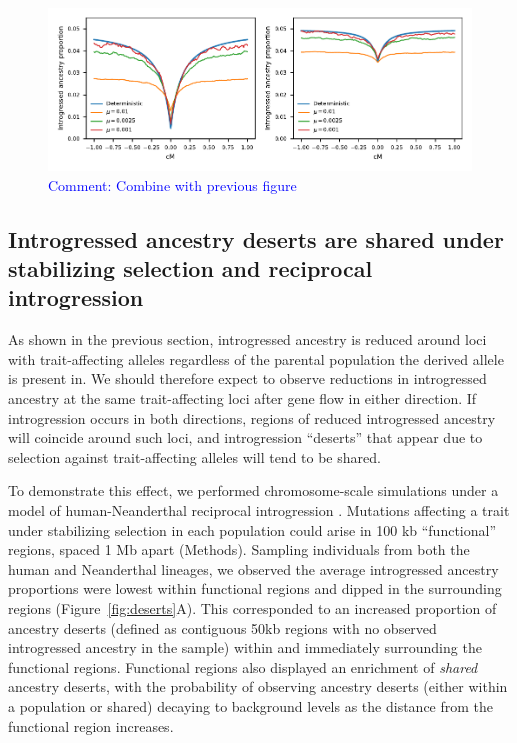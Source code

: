 \documentclass{article}
\newcommand{\aprcomment}[1]{{\textcolor{blue}{Comment: #1}}}
\begin{document}
\begin{figure}[t!]
    \centering
    \includegraphics{../figures/linkage_simulation.pdf}
    \caption{
        \textbf{}
        \aprcomment{Combine with previous figure}
    }
    \label{fig:linkage-sim}
\end{figure}

\subsection*{Introgressed ancestry deserts are shared under stabilizing
selection and reciprocal introgression}

As shown in the previous section, introgressed ancestry is reduced around loci
with trait-affecting alleles regardless of the parental population the derived
allele is present in. We should therefore expect to observe reductions in
introgressed ancestry at the same trait-affecting loci after gene flow in
either direction. If introgression occurs in both directions, regions of
reduced introgressed ancestry will coincide around such loci, and introgression
``deserts'' that appear due to selection against trait-affecting alleles will
tend to be shared.

To demonstrate this effect, we performed chromosome-scale simulations under a
model of human-Neanderthal reciprocal introgression
\citep[Figure~\ref{fig:neand-to-human}A,][]{harris2023diverse}. Mutations
affecting a trait under stabilizing selection in each population could arise in
100 kb ``functional'' regions, spaced 1 Mb apart (Methods). Sampling
individuals from both the human and Neanderthal lineages, we observed the
average introgressed ancestry proportions were lowest within functional regions
and dipped in the surrounding regions (Figure~\ref{fig:deserts}A). This
corresponded to an increased proportion of ancestry deserts (defined as
    contiguous 50kb regions with no observed introgressed ancestry in the
sample) within and immediately surrounding the functional regions. Functional
regions also displayed an enrichment of \emph{shared} ancestry deserts, with
the probability of observing ancestry deserts (either within a population or
shared) decaying to background levels as the distance from the functional
region increases.
\end{document}
